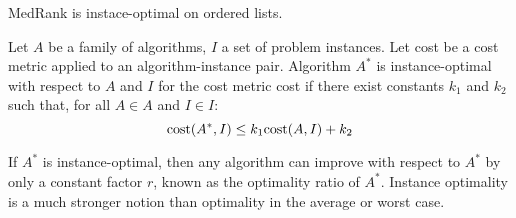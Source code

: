 \begin{property}
    MedRank is instace-optimal on ordered lists.
\end{property}
\begin{theorem}
    Let $A$ be a family of algorithms, $I$ a set of problem instances. 
    Let cost be a cost metric applied to an algorithm-instance pair. 
    Algorithm $A^{*}$ is instance-optimal with respect to $A$ and $I$ for the cost metric cost if there exist constants $k_1$ and $k_2$ such that, for all $A \in A$ and $I \in I$: 
    \[\textnormal{cost}(A^{*}, I) \leq k_1 \textnormal{cost}(A, I) + k_2\]
\end{theorem}

If $A^{*}$ is instance-optimal, then any algorithm can improve with respect to $A^{*}$ by only a constant factor $r$, known as the optimality ratio of $A^{*}$.
Instance optimality is a much stronger notion than optimality in the average or worst case.